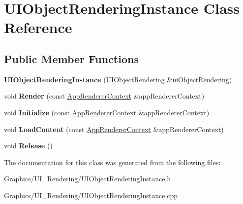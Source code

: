 \hypertarget{classUIObjectRenderingInstance}{}\section{U\+I\+Object\+Rendering\+Instance Class Reference}
\label{classUIObjectRenderingInstance}
\subsection*{Public Member Functions}
\begin{DoxyCompactItemize}
\item 
\mbox{\label{classUIObjectRenderingInstance_a07335d33cd54d0540e561e23dfa90e05}} 
{\bfseries U\+I\+Object\+Rendering\+Instance} (\hyperlink{classUIObjectRendering}{U\+I\+Object\+Rendering} \&ui\+Object\+Rendering)
\item 
\mbox{\label{classUIObjectRenderingInstance_ae7d3771ce7a7777076e48dfbb748152c}} 
void {\bfseries Render} (const \hyperlink{structAppRendererContext}{App\+Renderer\+Context} \&app\+Renderer\+Context)
\item 
\mbox{\label{classUIObjectRenderingInstance_ae2718af401e3446c9d7b87e151ab9988}} 
void {\bfseries Initialize} (const \hyperlink{structAppRendererContext}{App\+Renderer\+Context} \&app\+Renderer\+Context)
\item 
\mbox{\label{classUIObjectRenderingInstance_aace44385d2796ffe03f49fa5c489e789}} 
void {\bfseries Load\+Content} (const \hyperlink{structAppRendererContext}{App\+Renderer\+Context} \&app\+Renderer\+Context)
\item 
\mbox{\label{classUIObjectRenderingInstance_a998994e7d160b6e3a4785f8fe7c76b5a}} 
void {\bfseries Release} ()
\end{DoxyCompactItemize}


The documentation for this class was generated from the following files\+:\begin{DoxyCompactItemize}
\item 
Graphics/\+U\+I\+\_\+\+Rendering/U\+I\+Object\+Rendering\+Instance.\+h\item 
Graphics/\+U\+I\+\_\+\+Rendering/U\+I\+Object\+Rendering\+Instance.\+cpp\end{DoxyCompactItemize}
